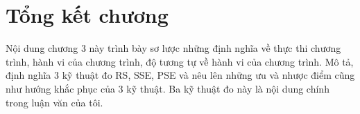 \section*{Tổng kết chương}
Nội dung chương 3 này trình bày sơ lược những định nghĩa về thực thi chương trình, hành vi của chương trình, độ tương tự về hành vi của chương trình. Mô tả, định nghĩa 3 kỹ thuật đo RS, SSE, PSE và nêu lên những ưu và nhược điểm cũng như hướng khắc phục của 3 kỹ thuật. Ba kỹ thuật đo này là nội dung chính trong luận văn của tôi.
